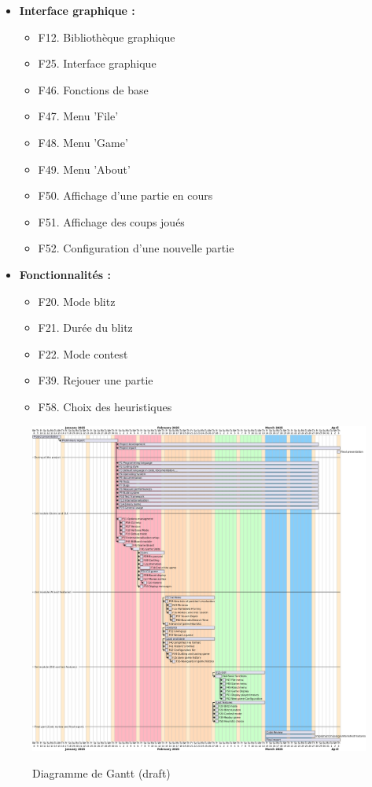 \documentclass{article}
\begin{document}
\begin{itemize}
    \item \textbf{Interface graphique :}
    \begin{itemize}
        \item F12. Bibliothèque graphique
        \item F25. Interface graphique
        \item F46. Fonctions de base
        \item F47. Menu ’File’
        \item F48. Menu ’Game’
        \item F49. Menu ’About’
        \item F50. Affichage d’une partie en cours
        \item F51. Affichage des coups joués
        \item F52. Configuration d’une nouvelle partie
    \end{itemize}
    \item \textbf{Fonctionnalités :}
    \begin{itemize}
        \item F20. Mode blitz
        \item F21. Durée du blitz
        \item F22. Mode contest
        \item F39. Rejouer une partie
        \item F58. Choix des heuristiques
    \end{itemize}
\end{itemize}

\begin{figure}[h]
    \caption{Diagramme de Gantt (draft)}
    \centering
    \includegraphics[width=\textwidth,height=\textheight,keepaspectratio]{gantt}
    \label{fig:gantt}
\end{figure}
\end{document}
